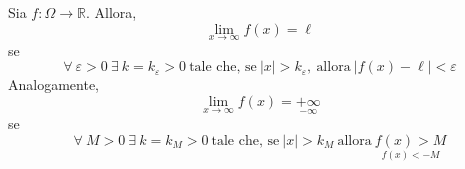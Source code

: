 \begin{definition} \label{Def: Limiti all'infinito}
    Sia $f:\Omega \to \mathbb{R}$. Allora, 
    \begin{equation*}
        \lim_{x \to \infty}{f(x)}=\ell
    \end{equation*}
    se
    \begin{equation*}
        \forall\ \varepsilon > 0 \ \exists\ k=k_\varepsilon>0 \ \text{tale che, se}\ |x|>k_\varepsilon,\ \text{allora}\ |f(x)-\ell|<\varepsilon
    \end{equation*}
    Analogamente,
    \begin{equation*}
        \lim_{x \to \infty}{f(x)}=\underset{-\infty}{+\infty}
    \end{equation*}
    se 
    \begin{equation*}
        \forall\ M>0\ \exists\ k=k_M>0 \ \text{tale che, se}\ |x|>k_M\ \text{allora}\ \underset{f(x)<-M}{f(x)>M}
    \end{equation*}
\end{definition}
